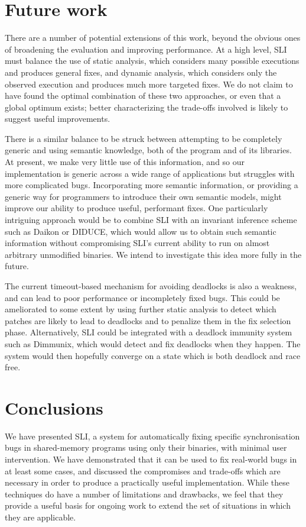 \documentclass[10pt,twocolumn,preprint,natbib,authoryear]{sigplanconf}
\newcommand{\editorial}[1]{}
\begin{document}
\section{Future work}

There are a number of potential extensions of this work, beyond the
obvious ones of broadening the evaluation and improving performance.
At a high level, SLI must balance the use of static analysis, which
considers many possible executions and produces general fixes, and
dynamic analysis, which considers only the observed execution and
produces much more targeted fixes.  We do not claim to have found the
optimal combination of these two approaches, or even that a global
optimum exists; better characterizing the trade-offs involved is
likely to suggest useful improvements.

There is a similar balance to be struck between attempting to be
completely generic and using semantic knowledge, both of the program
and of its libraries.  At present, we make very little use of this
information, and so our implementation is generic across a wide range
of applications but struggles with more complicated bugs.
Incorporating more semantic information, or providing a generic way
for programmers to introduce their own semantic models, might improve
our ability to produce useful, performant fixes.  One particularly
intriguing approach would be to combine SLI with an invariant
inference scheme such as Daikon\cite{Ernst2007} or
DIDUCE\cite{Hangal2002}, which would allow us to obtain such semantic
information without compromising SLI's current ability to run on
almost arbitrary unmodified binaries.  We intend to investigate this
idea more fully in the future.

The current timeout-based mechanism for avoiding deadlocks is also a
weakness, and can lead to poor performance or incompletely fixed bugs.
This could be ameliorated to some extent by using further static
analysis to detect which patches are likely to lead to deadlocks and
to penalize them in the fix selection phase.  Alternatively, SLI could
be integrated with a deadlock immunity system such as
Dimmunix\cite{Jula2008}, which would detect and fix deadlocks when
they happen.  The system would then hopefully converge on a state
which is both deadlock and race free.

\section{Conclusions}

We have presented SLI, a system for automatically fixing specific
synchronisation bugs in shared-memory programs using only their
binaries, with minimal user intervention.  We have demonstrated that
it can be used to fix real-world bugs in at least some cases, and
discussed the compromises and trade-offs which are necessary in order
to produce a practically useful implementation.  While these
techniques do have a number of limitations and drawbacks, we feel that
they provide a useful basis for ongoing work to extend the set of
situations in which they are applicable.\editorial{Wibble wibble
  wibble}




\end{document}
